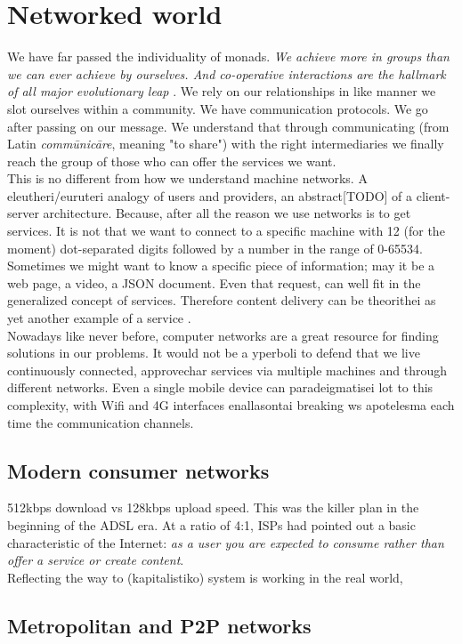 \newpage
\section{Networked world}
We have far passed the individuality of monads. \emph{We achieve more in groups than we can ever achieve by ourselves. And co-operative interactions are the hallmark of all major evolutionary leap} \cite{Christakis2011}. We rely on our relationships in like manner we slot ourselves within a community. We have communication protocols. We go after passing on our message. We understand that through communicating (from Latin \emph{comm\={u}nic\={a}re}, meaning "to share") with the right intermediaries we finally reach the group of those who can offer the services we want.\\
\indent This is no different from how we understand machine networks.
A eleutheri/euruteri analogy of users and providers, an abstract[TODO] of a client-server architecture.
Because, after all the reason we use networks is to get services.
It is not that we want to connect to a specific machine with 12 (for the moment) dot-separated digits followed by a number in the range of 0-65534.\\
\indent Sometimes we might want to know a specific piece of information; may it be a web page, a video, a JSON document.
Even that request, can well fit in the generalized concept of services.
Therefore content delivery can be theorithei as yet another example of a service \cite{Braun2011}.\\
\indent Nowadays like never before, computer networks are a great resource for finding solutions in our problems.
It would not be a yperboli to defend that we live continuously connected, approvechar services via multiple machines and through different networks.
Even a single mobile device can paradeigmatisei lot to this complexity, with Wifi and 4G interfaces enallasontai breaking ws apotelesma each time the communication channels.\\

\subsection{Modern consumer networks}
512kbps download vs 128kbps upload speed.
This was the killer plan in the beginning of the ADSL era.
At a ratio of 4:1, ISPs  had pointed out a basic characteristic of the Internet: \emph{as a user you are expected to consume rather than offer a service or create content}.\\
\indent Reflecting the way to (kapitalistiko) system is working in the real world, 


\subsection{Metropolitan and P2P networks}